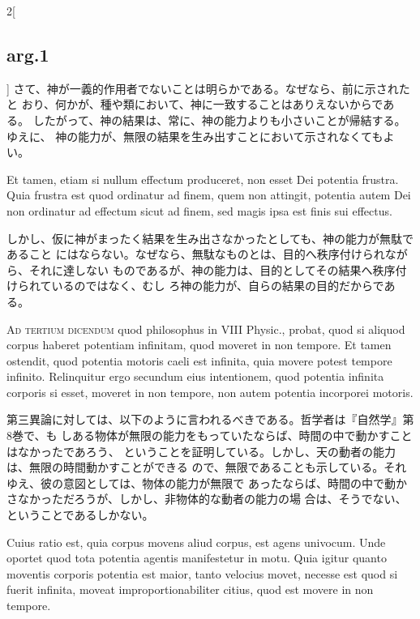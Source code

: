 \documentclass[paper=a4paper,fontsize=10pt,jafontsize=9pt,titlepage]{jlreq}
\begin{document}
\begin{paracol}{2}[\subsection{arg.1}]
さて、神が一義的作用者でないことは明らかである。なぜなら、前に示されたと
 おり、何かが、種や類において、神に一致することはありえないからである。
したがって、神の結果は、常に、神の能力よりも小さいことが帰結する。ゆえに、
 神の能力が、無限の結果を生み出すことにおいて示されなくてもよい。

\switchcolumn*

Et tamen, etiam
 si nullum effectum produceret, non esset Dei potentia frustra. Quia
 frustra est quod ordinatur ad finem, quem non attingit, potentia autem
 Dei non ordinatur ad effectum sicut ad finem, sed magis ipsa est finis
 sui effectus.

\switchcolumn

しかし、仮に神がまったく結果を生み出さなかったとしても、神の能力が無駄であること
にはならない。なぜなら、無駄なものとは、目的へ秩序付けられながら、それに達しない
ものであるが、神の能力は、目的としてその結果へ秩序付けられているのではなく、むし
ろ神の能力が、自らの結果の目的だからである。

\switchcolumn*[\subsection{ad.3}]

{\scshape Ad tertium dicendum} quod philosophus in VIII Physic., probat, quod si
aliquod corpus haberet potentiam infinitam, quod moveret in non tempore. Et
tamen ostendit, quod potentia motoris caeli est infinita, quia movere potest
tempore infinito. Relinquitur ergo secundum eius intentionem, quod potentia
infinita corporis si esset, moveret in non tempore, non autem potentia
incorporei motoris.

\switchcolumn

第三異論に対しては、以下のように言われるべきである。哲学者は『自然学』第8巻で、も
しある物体が無限の能力をもっていたならば、時間の中で動かすことはなかったであろう、
ということを証明している。しかし、天の動者の能力は、無限の時間動かすことができる
ので、無限であることも示している。それゆえ、彼の意図としては、物体の能力が無限で
あったならば、時間の中で動かさなかっただろうが、しかし、非物体的な動者の能力の場
合は、そうでない、ということであるしかない。
 

\switchcolumn*

Cuius ratio est, quia
 corpus movens aliud corpus, est agens univocum. Unde oportet quod tota
 potentia agentis manifestetur in motu. Quia igitur quanto moventis
 corporis potentia est maior, tanto velocius movet, necesse est quod si
 fuerit infinita, moveat improportionabiliter citius, quod est movere in
 non tempore.


\end{paracol}
\end{document}
